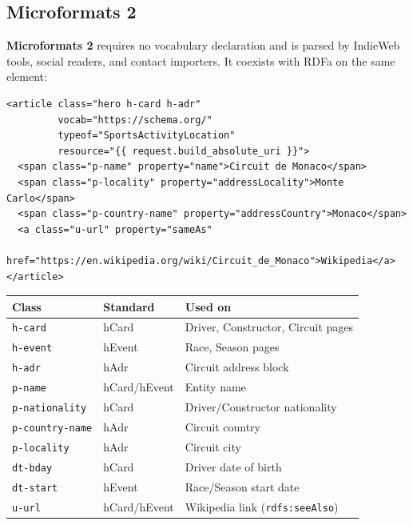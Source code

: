 \documentclass[12pt,a4paper]{article}
\begin{document}
\subsection{Microformats 2}

\textbf{Microformats 2} requires no vocabulary declaration and is parsed by IndieWeb
tools, social readers, and contact importers. It coexists with RDFa on the same element:

\begin{lstlisting}[style=html, caption={Microformats 2 on the circuit detail page (h-card + h-adr)}]
<article class="hero h-card h-adr"
         vocab="https://schema.org/"
         typeof="SportsActivityLocation"
         resource="{{ request.build_absolute_uri }}">
  <span class="p-name" property="name">Circuit de Monaco</span>
  <span class="p-locality" property="addressLocality">Monte Carlo</span>
  <span class="p-country-name" property="addressCountry">Monaco</span>
  <a class="u-url" property="sameAs"
     href="https://en.wikipedia.org/wiki/Circuit_de_Monaco">Wikipedia</a>
</article>
\end{lstlisting}

\begin{center}
\begin{tabular}{@{}lll@{}}
\toprule
\textbf{Class} & \textbf{Standard} & \textbf{Used on} \\
\midrule
\texttt{h-card}         & hCard  & Driver, Constructor, Circuit pages \\
\texttt{h-event}        & hEvent & Race, Season pages \\
\texttt{h-adr}          & hAdr   & Circuit address block \\
\texttt{p-name}         & hCard/hEvent & Entity name \\
\texttt{p-nationality}  & hCard  & Driver/Constructor nationality \\
\texttt{p-country-name} & hAdr   & Circuit country \\
\texttt{p-locality}     & hAdr   & Circuit city \\
\texttt{dt-bday}        & hCard  & Driver date of birth \\
\texttt{dt-start}       & hEvent & Race/Season start date \\
\texttt{u-url}          & hCard/hEvent & Wikipedia link (\texttt{rdfs:seeAlso}) \\
\bottomrule
\end{tabular}
\end{center}
\end{document}
